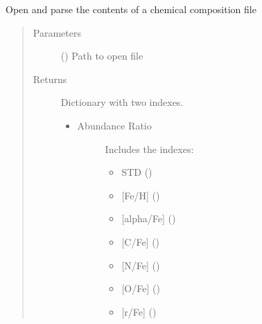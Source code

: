 \documentclass[letterpaper,10pt,english]{sphinxmanual}
\begin{document}

\begin{fulllineitems}
\label{\detokenize{pyTOPSScrape.parse:pyTOPSScrape.parse.abundance.open_and_parse}}
\sphinxAtStartPar
Open and parse the contents of a chemical composition file
\begin{quote}\begin{description}
\item[{Parameters}] \leavevmode
\sphinxAtStartPar
{} () \textendash{} Path to open file

\item[{Returns}] \leavevmode
\sphinxAtStartPar

\sphinxAtStartPar
{} \textendash{}

\sphinxAtStartPar
Dictionary with two indexes.
\begin{itemize}
\item {} \begin{description}
\item[{Abundance Ratio}] \leavevmode
\sphinxAtStartPar
Includes the indexes:
\begin{itemize}
\item {} 
\sphinxAtStartPar
STD ()

\item {} 
\sphinxAtStartPar
{[}Fe/H{]} ()

\item {} 
\sphinxAtStartPar
{[}alpha/Fe{]} ()

\item {} 
\sphinxAtStartPar
{[}C/Fe{]} ()

\item {} 
\sphinxAtStartPar
{[}N/Fe{]} ()

\item {} 
\sphinxAtStartPar
{[}O/Fe{]} ()

\item {} 
\sphinxAtStartPar
{[}r/Fe{]} ()


\end{itemize}
\end{description}
\end{itemize}
\end{description}
\end{quote}
\end{fulllineitems}
\end{document}
